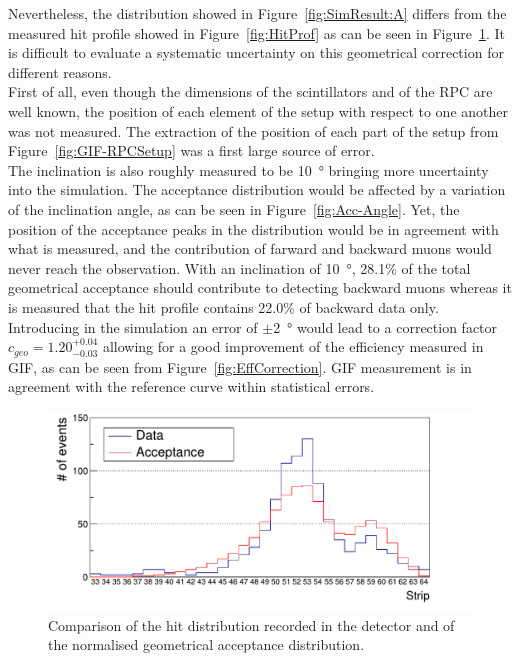 	Nevertheless, the distribution showed in Figure~\ref{fig:SimResult:A} differs from the measured hit profile showed in Figure~\ref{fig:HitProf} as can be seen in Figure~\ref{fig:Data-Acc-Comp}. It is difficult to evaluate a systematic uncertainty on this geometrical correction for different reasons.\\
	First of all, even though the dimensions of the scintillators and of the RPC are well known, the position of each element of the setup with respect to one another was not measured. The extraction of the position of each part of the setup from Figure~\ref{fig:GIF-RPCSetup} was a first large source of error.\\
	The inclination is also roughly measured to be \SI{10}{\degree} bringing more uncertainty into the simulation. The acceptance distribution would be affected by a variation of the inclination angle, as can be seen in Figure~\ref{fig:Acc-Angle}. Yet, the position of the acceptance peaks in the distribution would be in agreement with what is measured, and the contribution of farward and backward muons would never reach the observation. With an inclination of \SI{10}{\degree}, 28.1\% of the total geometrical acceptance should contribute to detecting backward muons whereas it is measured that the hit profile contains 22.0\% of backward data only. Introducing in the simulation an error of $\pm$\SI{2}{\degree} would lead to a correction factor $c_{geo} = 1.20^{+0.04}_{-0.03}$ allowing for a good improvement of the efficiency measured in GIF, as can be seen from Figure~\ref{fig:EffCorrection}. GIF measurement is in agreement with the reference curve within statistical errors.
	
\endgroup
\newpage

	\begin{figure}[H]
		\centering
		\includegraphics[width = .7\linewidth]{fig/chapt5/Data-Acc-Comp.pdf}
		\caption{\label{fig:Data-Acc-Comp} Comparison of the hit distribution recorded in the detector and of the normalised geometrical acceptance distribution.}
	\end{figure}

